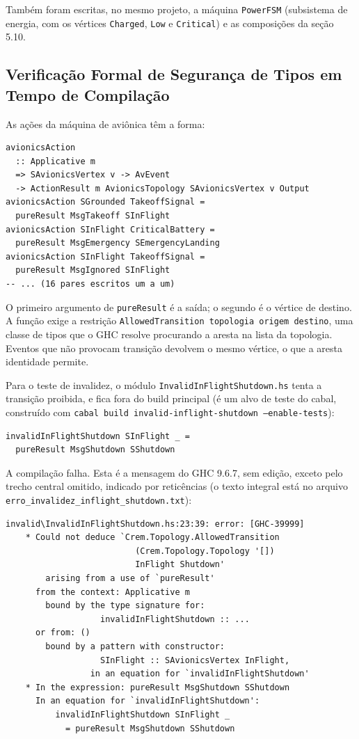 \documentclass[12pt,a4paper]{article}
\begin{document}
Também foram escritas, no mesmo projeto, a máquina \texttt{PowerFSM} (subsistema de energia, com os vértices \texttt{Charged}, \texttt{Low} e \texttt{Critical}) e as composições da seção 5.10.

\subsection{Verificação Formal de Segurança de Tipos em Tempo de Compilação}

As ações da máquina de aviônica têm a forma:

\begin{verbatim}
avionicsAction
  :: Applicative m
  => SAvionicsVertex v -> AvEvent
  -> ActionResult m AvionicsTopology SAvionicsVertex v Output
avionicsAction SGrounded TakeoffSignal =
  pureResult MsgTakeoff SInFlight
avionicsAction SInFlight CriticalBattery =
  pureResult MsgEmergency SEmergencyLanding
avionicsAction SInFlight TakeoffSignal =
  pureResult MsgIgnored SInFlight
-- ... (16 pares escritos um a um)
\end{verbatim}

O primeiro argumento de \texttt{pureResult} é a saída; o segundo é o vértice de destino. A função exige a restrição \texttt{AllowedTransition topologia origem destino}, uma classe de tipos que o GHC resolve procurando a aresta na lista da topologia. Eventos que não provocam transição devolvem o mesmo vértice, o que a aresta identidade permite.

Para o teste de invalidez, o módulo \texttt{InvalidInFlightShutdown.hs} tenta a transição proibida, e fica fora do build principal (é um alvo de teste do cabal, construído com \texttt{cabal build invalid-inflight-shutdown --enable-tests}):

\begin{verbatim}
invalidInFlightShutdown SInFlight _ =
  pureResult MsgShutdown SShutdown
\end{verbatim}

A compilação falha. Esta é a mensagem do GHC 9.6.7, sem edição, exceto pelo trecho central omitido, indicado por reticências (o texto integral está no arquivo \texttt{erro\_invalidez\_inflight\_shutdown.txt}):

\begin{verbatim}
invalid\InvalidInFlightShutdown.hs:23:39: error: [GHC-39999]
    * Could not deduce `Crem.Topology.AllowedTransition
                          (Crem.Topology.Topology '[])
                          InFlight Shutdown'
        arising from a use of `pureResult'
      from the context: Applicative m
        bound by the type signature for:
                   invalidInFlightShutdown :: ...
      or from: ()
        bound by a pattern with constructor:
                   SInFlight :: SAvionicsVertex InFlight,
                 in an equation for `invalidInFlightShutdown'
    * In the expression: pureResult MsgShutdown SShutdown
      In an equation for `invalidInFlightShutdown':
          invalidInFlightShutdown SInFlight _
            = pureResult MsgShutdown SShutdown
\end{verbatim}
\end{document}
